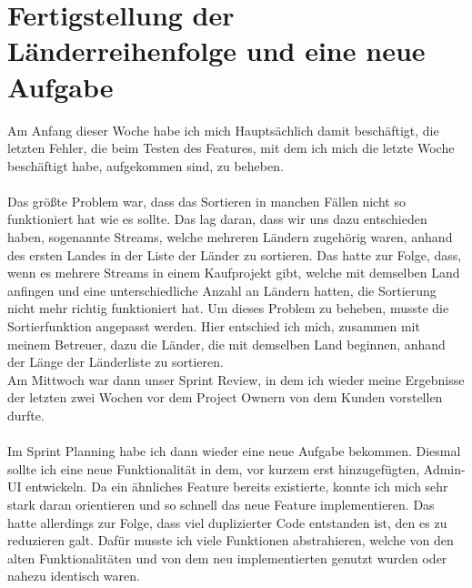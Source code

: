 \section{Fertigstellung der Länderreihenfolge und eine neue Aufgabe}
Am Anfang dieser Woche habe ich mich Hauptsächlich damit beschäftigt, die letzten Fehler, die beim Testen des Features, mit dem ich mich die letzte Woche beschäftigt habe, aufgekommen sind, zu beheben. \\\\
Das größte Problem war, dass das Sortieren in manchen Fällen nicht so funktioniert hat wie es sollte. Das lag daran, dass wir uns dazu entschieden haben, sogenannte Streams, welche mehreren Ländern zugehörig waren, anhand des ersten Landes in der Liste der Länder zu sortieren. Das hatte zur Folge, dass, wenn es mehrere Streams in einem Kaufprojekt gibt, welche mit demselben Land anfingen und eine unterschiedliche Anzahl an Ländern hatten, die Sortierung nicht mehr richtig funktioniert hat. Um dieses Problem zu beheben, musste die Sortierfunktion angepasst werden. Hier entschied ich mich, zusammen mit meinem Betreuer, dazu die Länder, die mit demselben Land beginnen, anhand der Länge der Länderliste zu sortieren. \\
Am Mittwoch war dann unser Sprint Review, in dem ich wieder meine Ergebnisse der letzten zwei Wochen vor dem Project Ownern von dem Kunden vorstellen durfte. \\\\
Im Sprint Planning habe ich dann wieder eine neue Aufgabe bekommen. Diesmal sollte ich eine neue Funktionalität in dem, vor kurzem erst hinzugefügten, Admin-UI entwickeln. Da ein ähnliches Feature bereits existierte, konnte ich mich sehr stark daran orientieren und so schnell das neue Feature implementieren. Das hatte allerdings zur Folge, dass viel duplizierter Code entstanden ist, den es zu reduzieren galt. Dafür musste ich viele Funktionen abstrahieren, welche von den alten Funktionalitäten und von dem neu implementierten genutzt wurden oder nahezu identisch waren. \\\\

